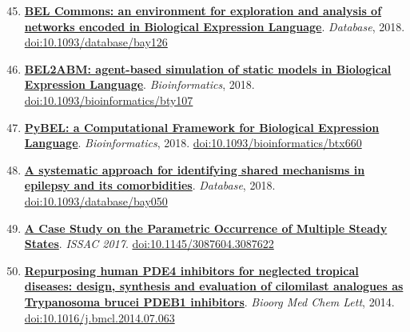 \documentclass[10pt,a4paper,sans]{moderncv} %
\newcommand{\wikidata}[2]{\href{https://bioregistry.io/wikidata:#1}{{#2}}}
\begin{document}
    \begin{enumerate}
    \setcounter{enumi}{44}
    \itemsep0.5em
        \item
            \wikidata{Q60302045}{\textbf{BEL Commons: an environment for exploration and analysis of networks encoded in Biological Expression Language}}.
    \textit{Database}, 2018.  {\scriptsize \href{https://bioregistry.io/doi:10.1093/DATABASE/BAY126}{doi:10.1093/database/bay126}}
        \item
            \wikidata{Q51056857}{\textbf{BEL2ABM: agent-based simulation of static models in Biological Expression Language}}.
    \textit{Bioinformatics}, 2018.  {\scriptsize \href{https://bioregistry.io/doi:10.1093/BIOINFORMATICS/BTY107}{doi:10.1093/bioinformatics/bty107}}
        \item
            \wikidata{Q42695788}{\textbf{PyBEL: a Computational Framework for Biological Expression Language}}.
    \textit{Bioinformatics}, 2018.  {\scriptsize \href{https://bioregistry.io/doi:10.1093/BIOINFORMATICS/BTX660}{doi:10.1093/bioinformatics/btx660}}
        \item
            \wikidata{Q55315340}{\textbf{A systematic approach for identifying shared mechanisms in epilepsy and its comorbidities}}.
    \textit{Database}, 2018.  {\scriptsize \href{https://bioregistry.io/doi:10.1093/DATABASE/BAY050}{doi:10.1093/database/bay050}}
    \end{enumerate}
    \begin{enumerate}
    \setcounter{enumi}{48}
    \itemsep0.5em
        \item
            \wikidata{Q47479157}{\textbf{A Case Study on the Parametric Occurrence of Multiple Steady States}}.
    \textit{ISSAC 2017}.  {\scriptsize \href{https://bioregistry.io/doi:10.1145/3087604.3087622}{doi:10.1145/3087604.3087622}}
    \end{enumerate}
    \begin{enumerate}
    \setcounter{enumi}{49}
    \itemsep0.5em
        \item
            \wikidata{Q34138086}{\textbf{Repurposing human PDE4 inhibitors for neglected tropical diseases: design, synthesis and evaluation of cilomilast analogues as Trypanosoma brucei PDEB1 inhibitors}}.
    \textit{Bioorg Med Chem Lett}, 2014.  {\scriptsize \href{https://bioregistry.io/doi:10.1016/J.BMCL.2014.07.063}{doi:10.1016/j.bmcl.2014.07.063}}
    \end{enumerate}
\end{document}
